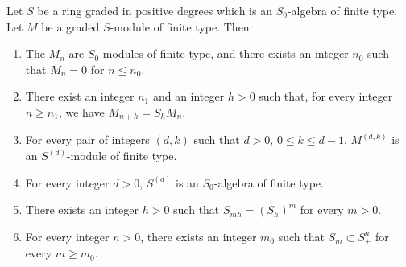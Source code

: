 \begin{lemma}[2.1.6]
\label{II.2.1.6}
Let $S$ be a ring graded in positive degrees which is an $S_0$-algebra of
finite type. Let $M$ be a graded $S$-module of finite type. Then:
\begin{enumerate}
  \item[\rm(i)] The $M_n$ are $S_0$-modules of finite type, and there exists
    an integer $n_0$ such that $M_n=0$ for $n\leq n_0$.
  \item[\rm(ii)] There exist an integer $n_1$ and an integer $h>0$ such that,
    for every integer $n\geq n_1$, we have $M_{n+h}=S_hM_n$.
  \item[\rm(iii)] For every pair of integers $(d,k)$ such that $d>0$,
    $0\leq k\leq d-1$, $M^{(d,k)}$ is an $S^{(d)}$-module of finite type.
  \item[\rm(iv)] For every integer $d>0$, $S^{(d)}$ is an $S_0$-algebra of
    finite type.
  \item[\rm(v)] There exists an integer $h>0$ such that $S_{mh}=(S_h)^m$ for
    every $m>0$.
  \item[\rm(vi)] For every integer $n>0$, there exists an integer $m_0$ such
    that $S_m\subset S_+^n$ for every $m\geq m_0$.
\end{enumerate}
\end{lemma}

